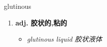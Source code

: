 
\begin{frame}
{\huge glutinous}
\begin{center}
\begin{enumerate}\Large
  \item \textbf{adj. 胶状的,粘的}
  \begin{itemize}
    \item \em{\Large{glutinous liquid 胶状液体}}
  \end{itemize}
\end{enumerate}
\end{center}
\end{frame}
